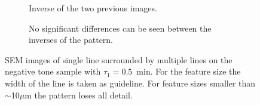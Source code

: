 \begin{figure}[htb]
\begin{subfigure}[t]{0.24\linewidth}
      	\caption{Inverse of the two previous images.}
      	\label{fig:b2d31_q32}
    \end{subfigure}
    \hfill
    \begin{subfigure}[t]{0.24\linewidth}
      	\caption{No significant differences can be seen between the inverses of the pattern.}
      	\label{fig:b2d33_q34}
    \end{subfigure}
    \caption{SEM images of single line surrounded by multiple lines on the negative tone sample with $\tau_1 = 0.5$~min. For the feature size the width of the line is taken as guideline. For feature sizes smaller than $\sim$10$\mu$m the pattern loses all detail.}
\end{figure}

